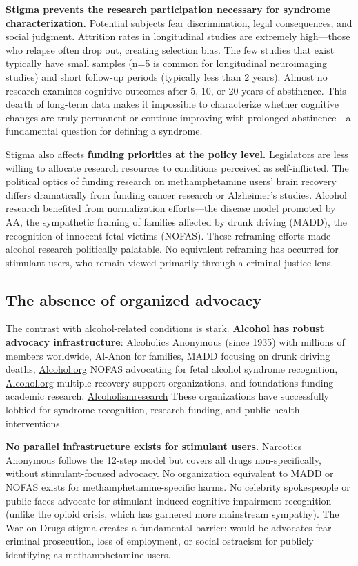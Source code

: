 \textbf{Stigma prevents the research participation necessary for syndrome characterization.} Potential subjects fear discrimination, legal consequences, and social judgment. Attrition rates in longitudinal studies are extremely high---those who relapse often drop out, creating selection bias. The few studies that exist typically have small samples (n=5 is common for longitudinal neuroimaging studies) and short follow-up periods (typically less than 2 years). Almost no research examines cognitive outcomes after 5, 10, or 20 years of abstinence. This dearth of long-term data makes it impossible to characterize whether cognitive changes are truly permanent or continue improving with prolonged abstinence---a fundamental question for defining a syndrome.

Stigma also affects \textbf{funding priorities at the policy level.} Legislators are less willing to allocate research resources to conditions perceived as self-inflicted. The political optics of funding research on methamphetamine users' brain recovery differs dramatically from funding cancer research or Alzheimer's studies. Alcohol research benefited from normalization efforts---the disease model promoted by AA, the sympathetic framing of families affected by drunk driving (MADD), the recognition of innocent fetal victims (NOFAS). These reframing efforts made alcohol research politically palatable. No equivalent reframing has occurred for stimulant users, who remain viewed primarily through a criminal justice lens.

\subsection{The absence of organized advocacy}\label{16_missing_syndrome-the-absence-of-organized-advocacy}

The contrast with alcohol-related conditions is stark. \textbf{Alcohol has robust advocacy infrastructure}: Alcoholics Anonymous (since 1935) with millions of members worldwide, Al-Anon for families, MADD focusing on drunk driving deaths, \href{https://alcohol.org/advocacy-groups/}{Alcohol.org} NOFAS advocating for fetal alcohol syndrome recognition, \href{https://alcohol.org/advocacy-groups/}{Alcohol.org} multiple recovery support organizations, and foundations funding academic research. \href{https://alcoholismresearch.org/}{Alcoholismresearch} These organizations have successfully lobbied for syndrome recognition, research funding, and public health interventions.

\textbf{No parallel infrastructure exists for stimulant users.} Narcotics Anonymous follows the 12-step model but covers all drugs non-specifically, without stimulant-focused advocacy. No organization equivalent to MADD or NOFAS exists for methamphetamine-specific harms. No celebrity spokespeople or public faces advocate for stimulant-induced cognitive impairment recognition (unlike the opioid crisis, which has garnered more mainstream sympathy). The War on Drugs stigma creates a fundamental barrier: would-be advocates fear criminal prosecution, loss of employment, or social ostracism for publicly identifying as methamphetamine users.

